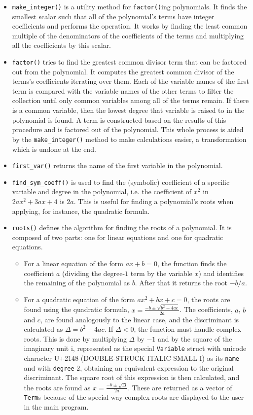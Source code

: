 \begin{itemize}
    \item \verb|make_integer()| is a utility method for \verb|factor()|ing polynomials. It finds the smallest scalar such that all of the polynomial's terms have integer coefficients and performs the operation. It works by finding the least common multiple of the denominators of the coefficients of the terms and multiplying all the coefficients by this scalar. 
    \item \verb|factor()| tries to find the greatest common divisor term that can be factored out from the polynomial. It computes the greatest common divisor of the terms's coefficients iterating over them. Each of the variable names of the first term is compared with the variable names of the other terms to filter the collection until only common variables among all of the terms remain. If there is a common variable, then the lowest degree that variable is raised to in the polynomial is found. A term is constructed based on the results of this procedure and is factored out of the polynomial. This whole process is aided by the \verb|make_integer()| method to make calculations easier, a transformation which is undone at the end.
    \item \verb|first_var()| returns the name of the first variable in the polynomial.
    \item \verb|find_sym_coeff()| is used to find the (symbolic) coefficient of a specific variable and degree in the polynomial, i.e. the coefficient of $x^2$ in $2ax^2 + 3ax + 4$ is $2a$. This is useful for finding a polynomial's roots when applying, for instance, the quadratic formula.
    \item \verb|roots()| defines the algorithm for finding the roots of a polynomial. It is composed of two parts: one for linear equations and one for quadratic equations.
    \begin{itemize}
        \item For a linear equation of the form $ax + b = 0$, the function finds the coefficient $a$ (dividing the degree-$1$ term by the variable $x$) and identifies the remaining of the polynomial as $b$. After that it returns the root $-b/a$.
        \item For a quadratic equation of the form $ax^2 + bx + c = 0$, the roots are found using the quadratic formula, $x = \frac{-b \pm \sqrt{b^2 - 4ac}}{2a}$. The coefficients, $a$, $b$ and $c$, are found analogously to the linear case, and the discriminant is calculated as $\Delta = b^2 - 4ac$. If $\Delta < 0$, the function must handle complex roots. This is done by multiplying $\Delta$ by $-1$ and by the square of the imaginary unit $\mathrm{i}$, represented as the special \verb|Variable| struct with unicode character U+2148 (DOUBLE-STRUCK ITALIC SMALL I) as its \verb|name| and with \verb|degree| $2$, obtaining an equivalent expression to the original discriminant. The square root of this expression is then calculated, and the roots are found as $x = \frac{-b \pm \sqrt{\Delta}}{2a}$. These are returned as a vector of \verb|Term|s because of the special way complex roots are displayed to the user in the main program.  %
    \end{itemize}
\end{itemize}

